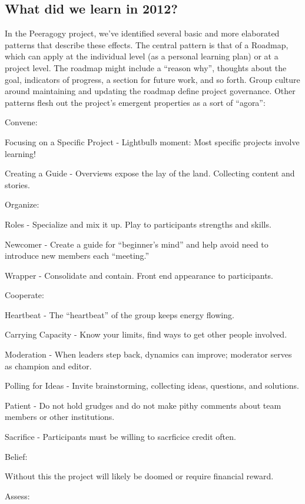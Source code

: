 \documentclass[twoside]{article}
\begin{document}
\begin{multicols}{2}
\subsection{What did we learn in 2012?}

In the Peeragogy project, we've identified several basic and more elaborated patterns that describe these effects. The central pattern is that of a Roadmap, which can apply at the individual level (as a personal learning plan) or at a project level. The roadmap might include a ``reason why'', thoughts about the goal, indicators of progress, a section for future work, and so forth. Group culture around maintaining and updating the roadmap define project governance. Other patterns flesh out the project's emergent properties as a sort of ``agora'':

Convene:

    Focusing on a Specific Project - Lightbulb moment: Most specific projects involve learning!

    Creating a Guide - Overviews expose the lay of the land. Collecting content and stories.

Organize:

    Roles - Specialize and mix it up. Play to participants strengths and skills.

    Newcomer - Create a guide for ``beginner's mind'' and help avoid need to introduce new members each ``meeting.''

    Wrapper - Consolidate and contain. Front end appearance to participants.

Cooperate:

    Heartbeat - The ``heartbeat'' of the group keeps energy flowing.

    Carrying Capacity - Know your limits, find ways to get other people involved.

    Moderation - When leaders step back, dynamics can improve; moderator serves as champion and editor.

    Polling for Ideas - Invite brainstorming, collecting ideas, questions, and solutions.

    Patient - Do not hold grudges and do not make pithy comments about team members or other institutions.

    Sacrifice - Participants must be willing to sacrficice credit often.

Belief:

    Without this the project will likely be doomed or require financial reward.

Assess:


\end{multicols}
\end{document}
